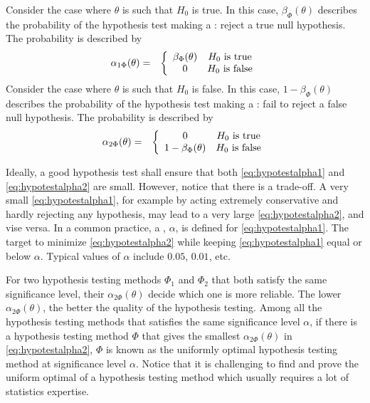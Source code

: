 Consider the case where $\theta$ is such that $H_0$ is true. In this case, $\beta_\Phi(\theta)$ describes the probability of the hypothesis test making a : reject a true null hypothesis. The probability is described by
\begin{eqnarray}
	\alpha_{1\Phi}(\theta) &=& \left\{\begin{array}{cc}
		\beta_\Phi(\theta) & H_0 \textup{~is true} \\
		0 & H_0 \textup{~is false}
	\end{array}\right. \label{eq:hypotestalpha1}
\end{eqnarray}
Consider the case where $\theta$ is such that $H_0$ is false. In this case, $1-\beta_\Phi(\theta)$ describes the probability of the hypothesis test making a : fail to reject a false null hypothesis. The probability is described by
\begin{eqnarray}
	\alpha_{2\Phi}(\theta) &=& \left\{\begin{array}{cc}
		0 & H_0 \textup{~is true} \\
		1-\beta_\Phi(\theta) & H_0 \textup{~is false}
	\end{array}\right. \label{eq:hypotestalpha2}
\end{eqnarray}

Ideally, a good hypothesis test shall ensure that both \eqref{eq:hypotestalpha1} and \eqref{eq:hypotestalpha2} are small. However, notice that there is a trade-off. A very small \eqref{eq:hypotestalpha1}, for example by acting extremely conservative and hardly rejecting any hypothesis, may lead to a very large \eqref{eq:hypotestalpha2}, and vise versa. In a common practice, a , $\alpha$, is defined for \eqref{eq:hypotestalpha1}. The target to minimize \eqref{eq:hypotestalpha2} while keeping \eqref{eq:hypotestalpha1} equal or below $\alpha$. Typical values of $\alpha$ include $0.05$, $0.01$, etc. 

For two hypothesis testing methods $\Phi_1$ and $\Phi_2$ that both satisfy the same significance level, their $\alpha_{2\Phi}(\theta)$ decide which one is more reliable. The lower $\alpha_{2\Phi}(\theta)$, the better the quality of the hypothesis testing. Among all the hypothesis testing methods that satisfies the same significance level $\alpha$, if there is a hypothesis testing method $\Phi$ that gives the smallest $\alpha_{2\Phi}(\theta)$ in \eqref{eq:hypotestalpha2}, $\Phi$ is known as the uniformly optimal hypothesis testing method at significance level $\alpha$. Notice that it is challenging to find and prove the uniform optimal of a hypothesis testing method which usually requires a lot of statistics expertise.

